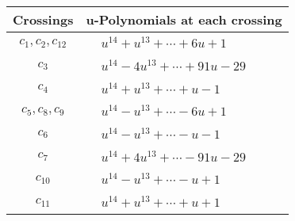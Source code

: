 \documentclass[1p]{elsarticle_modified}
\theoremstyle{definition}
\begin{document}
\begin{tabular}{m{50pt}|m{274pt}}
Crossings & \hspace{64pt}u-Polynomials at each crossing \\
\hline $$\begin{aligned}c_{1},c_{2},c_{12}\end{aligned}$$&$\begin{aligned}
&u^{14}+u^{13}+\cdots+6 u+1
\end{aligned}$\\
\hline $$\begin{aligned}c_{3}\end{aligned}$$&$\begin{aligned}
&u^{14}-4 u^{13}+\cdots+91 u-29
\end{aligned}$\\
\hline $$\begin{aligned}c_{4}\end{aligned}$$&$\begin{aligned}
&u^{14}+u^{13}+\cdots+u-1
\end{aligned}$\\
\hline $$\begin{aligned}c_{5},c_{8},c_{9}\end{aligned}$$&$\begin{aligned}
&u^{14}- u^{13}+\cdots-6 u+1
\end{aligned}$\\
\hline $$\begin{aligned}c_{6}\end{aligned}$$&$\begin{aligned}
&u^{14}- u^{13}+\cdots- u-1
\end{aligned}$\\
\hline $$\begin{aligned}c_{7}\end{aligned}$$&$\begin{aligned}
&u^{14}+4 u^{13}+\cdots-91 u-29
\end{aligned}$\\
\hline $$\begin{aligned}c_{10}\end{aligned}$$&$\begin{aligned}
&u^{14}- u^{13}+\cdots- u+1
\end{aligned}$\\
\hline $$\begin{aligned}c_{11}\end{aligned}$$&$\begin{aligned}
&u^{14}+u^{13}+\cdots+u+1
\end{aligned}$\\
\hline
\end{tabular}\\~\\
\end{document}
